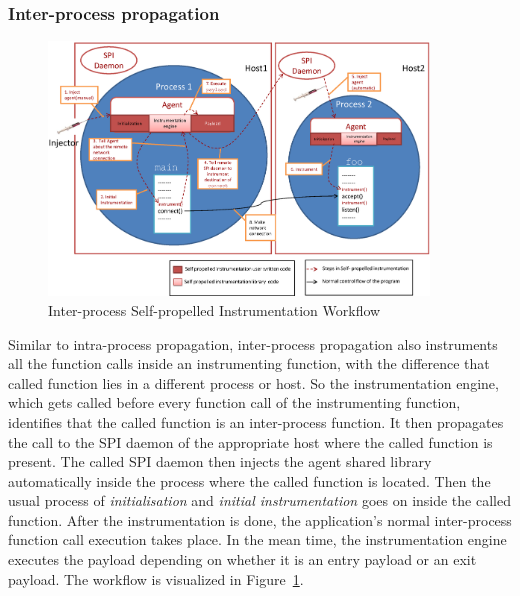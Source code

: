 \subsubsection{Inter-process propagation}
\begin{figure}[ht]
  \centering
  \includegraphics[width=0.90\textwidth]{figure/interprocess.eps}
  \caption{Inter-process Self-propelled Instrumentation Workflow}
  \label{fig:Inter-process Self-propelled Instrumentation}
\end{figure}

Similar to intra-process propagation, inter-process propagation also
instruments all the function calls inside an instrumenting function, with
the difference that
called function lies in a different process or host. So the instrumentation
engine, which gets called before every function call of the instrumenting
function, identifies that the called function is an inter-process function. It
then propagates the call to the SPI daemon of the appropriate host where
the called function is present.
The called SPI daemon then injects the agent shared library automatically
inside the process where the called function is located. Then the usual
process of \textit{initialisation} and \textit{initial instrumentation} goes
on inside the called function. After the instrumentation is done, the
application's normal inter-process function call execution takes place. In
the mean time, the instrumentation engine executes the payload depending on
whether it is an entry payload or an exit payload. The workflow is visualized
in Figure~\ref{fig:Inter-process Self-propelled Instrumentation}.





